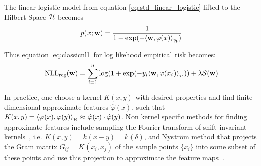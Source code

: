 The linear logistic model from equation \ref{eq:std_linear_logistic} lifted to
the Hilbert Space $\mathcal{H}$ becomes
\begin{equation}
p(x;\mathrm{\mathbf{w}}) = \frac{1}{1+\exp(-\langle \mathrm{\mathbf{w}},\varphi(x)\rangle_{_{\mathcal{H}}})}
\end{equation}

Thus equation \ref{eq:classicnll} for log likehood empirical risk becomes:
\begin{equation}
\text{NLL}_{\text{reg}}(\mathrm{\mathbf{w}}) =  \sum_{i=1}^n \log(1+\exp(-y_i
\langle \mathrm{\mathbf{w}},\varphi(x_i)\rangle_{_{\mathcal{H}}})) +\lambda\mathcal{S}(\mathrm{\mathbf{w}})
\end{equation}

In practice, one choose a kernel $K(x,y)$ with desired properties and
find finite dimensional approximate features $\hat\varphi(x)$, such that
$K(x,y)=\langle \varphi(x),\varphi(y)\rangle_{_{\mathcal{H}}}\approx\hat\varphi(x)\cdot\hat\varphi(y)$.
Non kernel specific methods for finding approximate features include sampling
the Fourier transform of shift invariant kernels~\cite{rahimi2007random}, i.e.
$K(x,y)=k(x-y)=k(\delta)$, and Nystr\"om method that projects the Gram matrix
$G_{ij}=K(x_i,x_j)$ of the sample points $\{x_i\}$ into some subset of these
points and use this projection to approximate the feature
maps~\cite{williams2000using}.

